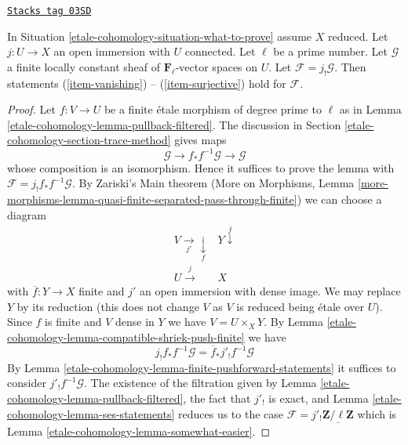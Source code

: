 \begin{lemma}
\label{etale-cohomology-lemma-vanishing-easier}
\href{https://stacks.math.columbia.edu/tag/03SD}{\texttt{Stacks tag 03SD}}

In Situation \ref{etale-cohomology-situation-what-to-prove} assume $X$ reduced.
Let $j : U \to X$ an open immersion with $U$ connected. Let
$\ell$ be a prime number. Let $\mathcal{G}$ a finite locally
constant sheaf of $\mathbf{F}_\ell$-vector spaces on $U$. Let
$\mathcal{F} = j_!\mathcal{G}$. Then statements
(\ref{item-vanishing}) -- (\ref{item-surjective}) hold for $\mathcal{F}$.
\end{lemma}

\begin{proof}
Let $f : V \to U$ be a finite \'etale morphism of degree prime to $\ell$
as in Lemma \ref{etale-cohomology-lemma-pullback-filtered}. The discussion in
Section \ref{etale-cohomology-section-trace-method} gives maps
$$
\mathcal{G} \to f_*f^{-1}\mathcal{G} \to \mathcal{G}
$$
whose composition is an isomorphism. Hence it suffices to prove the
lemma with $\mathcal{F} = j_!f_*f^{-1}\mathcal{G}$.
By Zariski's Main theorem
(More on Morphisms, Lemma
\ref{more-morphisms-lemma-quasi-finite-separated-pass-through-finite})
we can choose a diagram
$$
\begin{array}{cc}V \underset{j'}{\longrightarrow}\underset{f}{\downarrow} & Y \overset{\overline{f}}{\downarrow} \\ U \overset{j}{\longrightarrow} & X\end{array}
$$
with $\overline{f} : Y \to X$ finite and $j'$ an open immersion
with dense image. We may replace $Y$ by its reduction (this does
not change $V$ as $V$ is reduced being \'etale over $U$).
Since $f$ is finite and $V$ dense in $Y$ we have $V = U \times_X Y$. By
Lemma \ref{etale-cohomology-lemma-compatible-shriek-push-finite} we have
$$
j_!f_*f^{-1}\mathcal{G} = \overline{f}_*j'_!f^{-1}\mathcal{G}
$$
By Lemma \ref{etale-cohomology-lemma-finite-pushforward-statements} it suffices to
consider $j'_!f^{-1}\mathcal{G}$.
The existence of the filtration given by
Lemma \ref{etale-cohomology-lemma-pullback-filtered},
the fact that $j'_!$ is exact, and
Lemma \ref{etale-cohomology-lemma-ses-statements}
reduces us to the case
$\mathcal{F} = j'_!\underline{\mathbf{Z}/\ell\mathbf{Z}}$
which is Lemma \ref{etale-cohomology-lemma-somewhat-easier}.
\end{proof}



